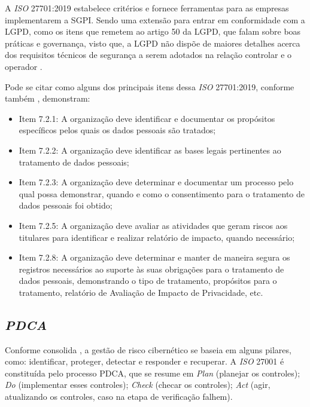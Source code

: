 \documentclass[
	12pt,				%
	openright,			%
	oneside,			%
	a4paper,			%
	english,			%
	french,				%
	spanish,			%
	brazil,				%
	]{abntex2}
\begin{document}
A \textit{ISO} 27701:2019 estabelece critérios e fornece ferramentas para as empresas implementarem a SGPI.  Sendo uma extensão para entrar em conformidade com a LGPD, como os itens que remetem ao artigo 50 da LGPD, que falam sobre boas práticas e governança, visto que, a LGPD não dispõe de maiores detalhes acerca dos requisitos técnicos de segurança a serem adotados na relação controlar e o operador \cite{lgpd1alves}. 

 Pode se citar como alguns dos principais itens dessa \textit{ISO} 27701:2019, conforme também \cite{Vainzof2020}, demonstram:
\begin{itemize}
\item Item 7.2.1: A organização deve identificar e documentar os propósitos específicos pelos quais os dados pessoais são tratados;
\item Item 7.2.2: A organização deve identificar as bases legais pertinentes ao tratamento de dados pessoais;
\item Item 7.2.3: A organização deve determinar e documentar um processo pelo qual possa demonstrar, quando e como o consentimento para o  tratamento de dados pessoais foi obtido;
\item Item 7.2.5: A organização deve avaliar as atividades que geram riscos aos titulares para identificar e realizar relatório de impacto, quando necessário;
\item Item 7.2.8: A organização deve determinar e manter de maneira segura os registros necessários ao suporte às suas obrigações para o tratamento de dados pessoais, demonstrando o tipo de tratamento, propósitos para o tratamento, relatório de Avaliação de Impacto de Privacidade, etc.
\end{itemize}

\subsection{ \textit{PDCA} }

Conforme consolida , a gestão de risco cibernético se baseia em alguns pilares, como: identificar, proteger, detectar e responder e recuperar. A \textit{ISO} 27001 é constituída pelo processo PDCA, que se resume em \textit{Plan} (planejar os controles); \textit{Do} (implementar esses controles); \textit{Check} (checar os controles); \textit{Act} (agir, atualizando os controles, caso na etapa de verificação falhem).
\end{document}
